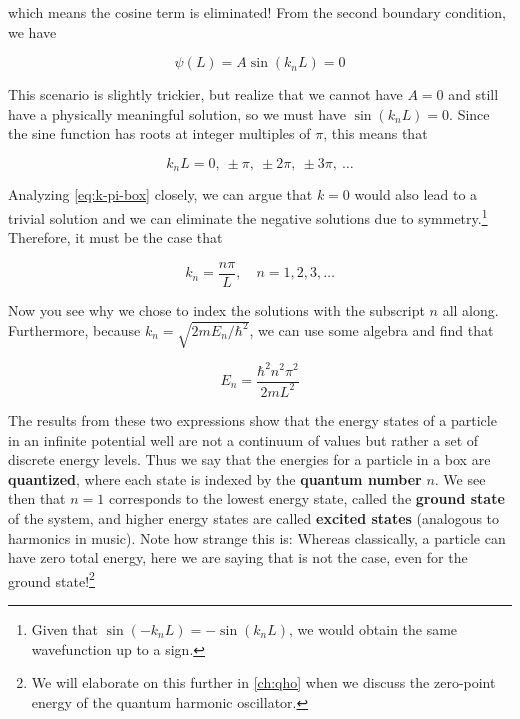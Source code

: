 \noindent which means the cosine term is eliminated! 
From the second boundary condition, we have

\begin{equation*}
	\psi(L) = A\sin(k_nL) = 0
\end{equation*}

This scenario is slightly trickier, but realize that we cannot have $A = 0$ and still have a physically meaningful solution, so we must have $\sin(k_nL) = 0$. 
Since the sine function has roots at integer multiples of $\pi$, this means that

\begin{equation}
	k_nL = 0,\ \pm\pi,\ \pm2\pi,\ \pm3\pi,\ \dots \label{eq:k-pi-box}
\end{equation}

Analyzing \autoref{eq:k-pi-box} closely, we can argue that $k = 0$ would also lead to a trivial solution and we can eliminate the negative solutions due to symmetry.\footnote{Given that $\sin(-k_nL) = -\sin(k_nL)$, we would obtain the same wavefunction up to a sign.} 
Therefore, it must be the case that 

\begin{tcolorbox}[title=Allowed values of $k$] \vspace{-2ex}
	\begin{equation}
		k_n = \frac{n\pi}{L}, \quad n = 1, 2, 3, \dots   \label{eq:k-box}
	\end{equation}
\end{tcolorbox}

Now you see why we chose to index the solutions with the subscript $n$ all along. 
Furthermore, because $k_n = \sqrt{2mE_n/\hbar^2}$, we can use some algebra and find that

\begin{tcolorbox}[title = Allowed energies] \vspace{-2ex}
	\begin{equation}
		E_n = \frac{\hbar^2n^2\pi^2}{2mL^2} \label{eq:E-box}
	\end{equation}
\end{tcolorbox}

The results from these two expressions show that the energy states of a particle in an infinite potential well are not a continuum of values but rather a set of discrete energy levels. 
Thus we say that the energies for a particle in a box are \textbf{quantized}, where each state is indexed by the \textbf{quantum number} $n$. 
We see then that $n = 1$ corresponds to the lowest energy state, called the \textbf{ground state} of the system, and higher energy states are called \textbf{excited states} (analogous to harmonics in music). 
Note how strange this is: Whereas classically, a particle can have zero total energy, here we are saying that is not the case, even for the ground state!\footnote{We will elaborate on this further in \autoref{ch:qho} when we discuss the zero-point energy of the quantum harmonic oscillator.} 



